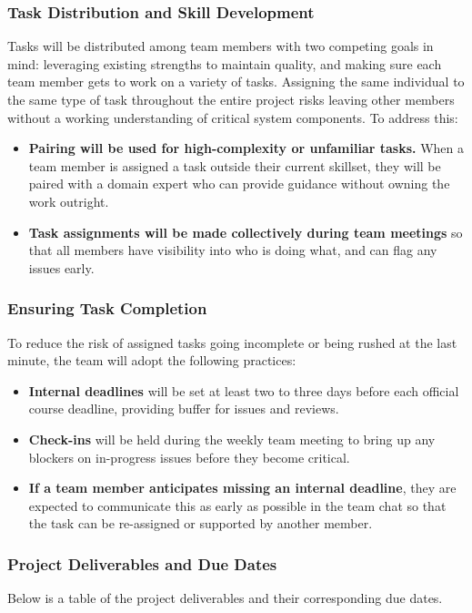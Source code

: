 \documentclass{article}
\begin{document}
\subsubsection*{Task Distribution and Skill Development}

Tasks will be distributed among team members with two competing goals in mind: leveraging existing strengths to maintain quality, and making sure each team member gets to work on a variety of tasks. Assigning the same individual to the same type of task throughout the entire project risks leaving other members without a working understanding of critical system components. To address this:

\begin{itemize}
  \item \textbf{Pairing will be used for high-complexity or unfamiliar tasks.} When a team member is assigned a task outside their current skillset, they will be paired with a domain expert who can provide guidance without owning the work outright.
  \item \textbf{Task assignments will be made collectively during team meetings} so that all members have visibility into who is doing what, and can flag any issues early.
\end{itemize}

\subsubsection*{Ensuring Task Completion}

To reduce the risk of assigned tasks going incomplete or being rushed at the last minute, the team will adopt the following practices:

\begin{itemize}
  \item \textbf{Internal deadlines} will be set at least two to three days before each official course deadline, providing buffer for issues and reviews.
  \item \textbf{Check-ins} will be held during the weekly team meeting to bring up any blockers on in-progress issues before they become critical.
  \item \textbf{If a team member anticipates missing an internal deadline}, they are expected to communicate this as early as possible in the team chat so that the task can be re-assigned or supported by another member.
\end{itemize}

\subsubsection*{Project Deliverables and Due Dates}
Below is a table of the project deliverables and their corresponding due dates.
\end{document}
